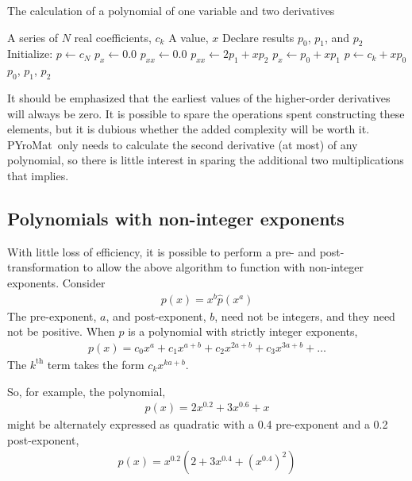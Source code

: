 \documentclass[letterpaper,11pt]{article}
\newcommand{\PM}{PYroMat}
\begin{document}
\begin{algorithm}
\caption{The calculation of a polynomial of one variable and two derivatives}\label{alg:1d:poly}
\begin{algorithmic}
\REQUIRE A series of $N$ real coefficients, $c_k$
\REQUIRE A value, $x$
\STATE Declare results $p_0$, $p_1$, and $p_2$
\STATE Initialize:
\STATE $p \leftarrow c_N$
\STATE $p_x \leftarrow 0.0$
\STATE $p_{xx} \leftarrow 0.0$
\STATE $p_{xx} \leftarrow 2p_1 + x p_2$
\STATE $p_x \leftarrow p_0 + x p_1$
\STATE $p \leftarrow c_k + x p_0$
\ENDFOR
\RETURN $p_0$, $p_1$, $p_2$
\end{algorithmic}
\end{algorithm}
It should be emphasized that the earliest values of the higher-order derivatives will always be zero.  It is possible to spare the operations spent constructing these elements, but it is dubious whether the added complexity will be worth it.  \PM\ only needs to calculate the second derivative (at most) of any polynomial, so there is little interest in sparing the additional two multiplications that implies.

\subsection{Polynomials with non-integer exponents}

With little loss of efficiency, it is possible to perform a pre- and post-transformation to allow the above algorithm to function with non-integer exponents.  Consider
\begin{align}
p(x) = x^b \hat{p}(x^a)
\end{align}
The pre-exponent, $a$, and post-exponent, $b$, need not be integers, and they need not be positive.  When $\hat{p}$ is a polynomial with strictly integer exponents, 
\begin{align}
p(x) = c_0 x^a + c_1 x^{a+b} + c_2 x^{2a+b} + c_3 x^{3a+b} + \ldots
\end{align}
The $k^\mathrm{th}$ term takes the form $c_k x^{ka+b}$.

So, for example, the polynomial,
\begin{align}
p(x) = 2 x^{0.2} + 3 x^{0.6} + x
\end{align}
might be alternately expressed as quadratic with a 0.4 pre-exponent and a 0.2 post-exponent,
\begin{align}
p(x) = x^{0.2} \left( 2 + 3 x^{0.4} + (x^{0.4})^2 \right)
\end{align}
\end{document}
